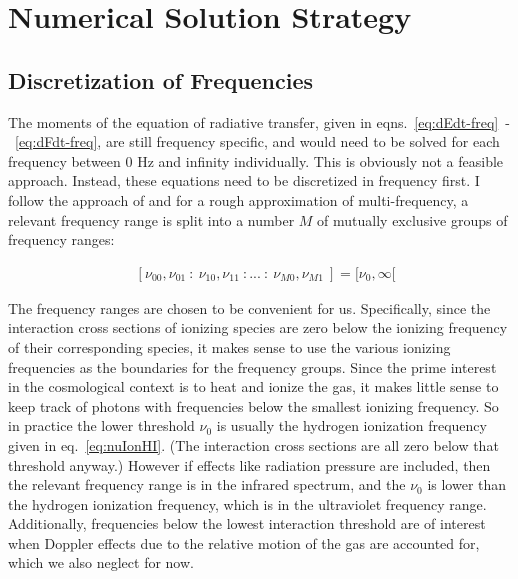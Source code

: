 \chapter{Numerical Solution Strategy}\label{chap:rt-numerical-strategy}


\section{Discretization of Frequencies}


The moments of the equation of radiative transfer, given in
eqns.~\ref{eq:dEdt-freq}~-~\ref{eq:dFdt-freq}, are still frequency specific, and would need to be
solved for each frequency between 0 Hz and infinity individually. This is obviously not a feasible
approach. Instead, these equations need to be discretized in frequency first. I follow the approach
of \cite{ramses-rt13} and for a rough approximation of multi-frequency, a relevant frequency range
is split into a number $M$ of mutually exclusive groups of frequency ranges:

\begin{align}
	& [\nu_{00}, \nu_{01}\ : \ \nu_{10}, \nu_{11}\ : ... \ : \ \nu_{M0}, \nu_{M1}\ ] =
        [\nu_{0}, \infty [
\end{align}

The frequency ranges are chosen to be convenient for us. Specifically, since the interaction cross
sections of ionizing species are zero below the ionizing frequency of their corresponding species,
it makes sense to use the various ionizing frequencies as the boundaries for the frequency groups.
Since the prime interest in the cosmological context is to heat and ionize the gas, it makes little
sense to keep track of photons with frequencies below the smallest ionizing frequency. So in
practice the lower threshold $\nu_0$ is usually the hydrogen ionization frequency given in
eq.~\ref{eq:nuIonHI}. (The interaction cross sections are all zero below that threshold anyway.)
However if effects like radiation pressure are included, then the relevant frequency range is in
the infrared spectrum, and the $\nu_0$ is lower than the hydrogen ionization frequency, which is in
the ultraviolet frequency range. Additionally, frequencies below the lowest interaction threshold
are of interest when Doppler effects due to the relative motion of the gas are accounted for, which
we also neglect for now.

